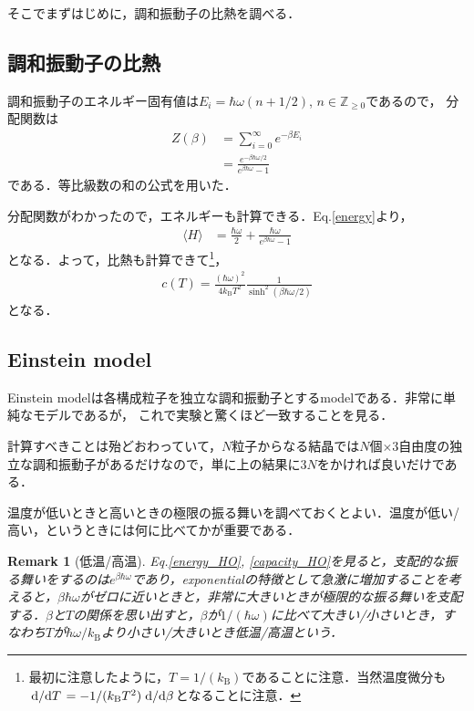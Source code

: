 \documentclass[dvipdfmx, a4paper]{jsarticle}
\theoremstyle{break}
\newtheorem{rem}[thm]{Remark}
\newcommand{\Z}{\mathbb{Z}}
\numberwithin{equation}{section}
\begin{document}
	そこでまずはじめに，調和振動子の比熱を調べる．
	\subsection{調和振動子の比熱}
	調和振動子のエネルギー固有値は$E_i = \hbar\omega(n + 1/2)$, $n\in\Z_{\geq 0}$であるので，
	分配関数は
	\begin{align}
			Z(\beta) 
			&= \sum_{i=0}^{\infty}e^{-\beta E_i}\\
			&= \frac{e^{-\beta \hbar \omega / 2}}{e^{\beta\hbar\omega}-1}
	\end{align}
	である．等比級数の和の公式を用いた．
	
	分配関数がわかったので，エネルギーも計算できる．Eq.\eqref{energy}より，
	\begin{align}
			\langle H \rangle 
			&= \frac{\hbar\omega}{2} + \frac{\hbar \omega}{e^{\beta\hbar\omega}-1}\label{energy_HO}
	\end{align}
	となる．よって，比熱も計算できて\footnote{最初に注意したように，$T = 1/(k_{\text{B}})$であることに注意．当然温度微分も$\dv*{}{T} =-1/(k_{\text{B}}T^2) \dv*{}{\beta} $となることに注意．}，
	\begin{align}
			c(T) = \frac{(\hbar \omega)^2}{4k_{\text{B}}T^2}\frac{1}{\sinh^2 (\beta \hbar \omega/2)}\label{capacity_HO}
	\end{align}
	となる．


	\subsection{Einstein model}
	Einstein modelは各構成粒子を独立な調和振動子とするmodelである．非常に単純なモデルであるが，
	これで実験と驚くほど一致することを見る．

	計算すべきことは殆どおわっていて，$N$粒子からなる結晶では$N$個$\times$$3$自由度の独立な調和振動子があるだけなので，単に上の結果に$3N$をかければ良いだけである．

	温度が低いときと高いときの極限の振る舞いを調べておくとよい．温度が低い/高い，というときには何に比べてかが重要である．
	\begin{rem}[低温/高温]
			Eq.\eqref{energy_HO}, \eqref{capacity_HO}を見ると，支配的な振る舞いをするのは$e^{\beta\hbar\omega}$であり，exponentialの特徴として急激に増加することを考えると，$\beta\hbar\omega$がゼロに近いときと，非常に大きいときが極限的な振る舞いを支配する．$\beta$と$T$の関係を思い出すと，$\beta$が$1/(\hbar\omega)$に比べて大きい/小さいとき，すなわち$T$が$\hbar\omega/k_{\text{B}}$より小さい/大きいとき低温/高温という．
	\end{rem}
\end{document}
